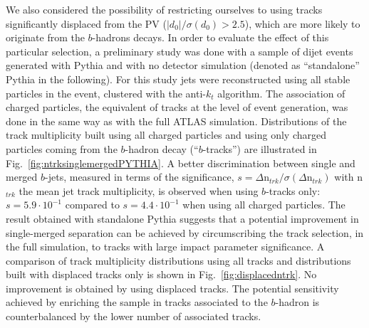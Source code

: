 We also considered the possibility  of restricting ourselves to using tracks significantly displaced from the PV  ($|d_0|/\sigma(d_0)> 2.5$), which are more likely to originate from the $b$-hadrons decays. 
In order to evaluate the effect of this particular selection, a preliminary study was done with a sample of dijet events generated with {\sc Pythia} and with no detector simulation (denoted as ``standalone'' {\sc Pythia} in the following). For this study jets were reconstructed using all stable particles in the event, clustered with the anti-$k_t$ algorithm. The association of charged particles, the equivalent of tracks at the level of event generation, was done in the same way as with the full ATLAS simulation. Distributions of the track multiplicity built using all charged particles and using only charged particles coming from the $b$-hadron decay (``$b$-tracks'') are illustrated in  Fig.~\ref{fig:ntrksinglemergedPYTHIA}. A better discrimination between single and merged $b$-jets, measured in terms of the significance, $s=\Delta\mbox{n}_{trk} / \sigma(\Delta\mbox{n}_{trk})$ with n$_{trk}$ the mean jet track multiplicity,
%
%
is observed  when using $b$-tracks only: $s=5.9 \cdot 10^{-1}$ compared to $s=4.4\cdot 10^{-1}$ when using all charged particles. The result obtained with standalone {\sc Pythia} suggests that a potential improvement in single-merged separation can be achieved by circumscribing the track selection, in the full simulation, to tracks with large impact parameter significance. %
 A comparison of track multiplicity distributions using all tracks and distributions built with displaced tracks only is shown in Fig.~\ref{fig:displacedntrk}. No improvement is obtained by using displaced tracks. The potential sensitivity achieved by enriching the sample in tracks associated to the $b$-hadron is counterbalanced by the lower number of associated tracks.

